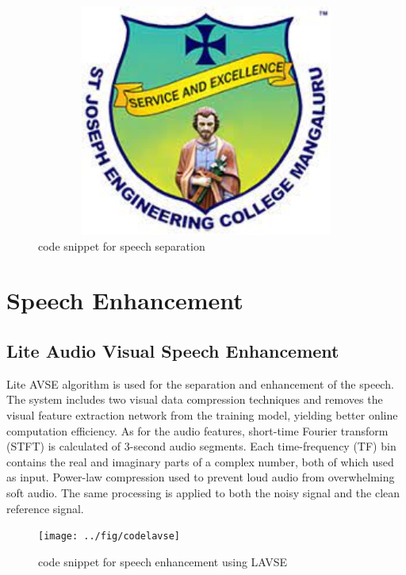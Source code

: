 \documentclass[12pt,a4paper]{report}
\begin{document}
\begin{figure}[hbtp]
\centering
\includegraphics[width=5in,height=3in]{./pic/sjeclogo.png}
\caption{code snippet for speech separation}
\end{figure}

\section{Speech Enhancement}
\subsection{Lite Audio Visual Speech Enhancement}
\par
Lite AVSE algorithm is used for the separation and enhancement of the speech. The system 
includes two visual data compression techniques and removes the visual feature extraction 
network from the training model, yielding better online computation efficiency. As for the audio 
features, short-time Fourier transform (STFT) is calculated of 3-second audio segments. Each 
time-frequency (TF) bin contains the real and imaginary parts of a complex number, both of 
which used as input. Power-law compression used to prevent loud audio from overwhelming soft 
audio. The same processing is applied to both the noisy signal and the clean reference signal.

\begin{figure}[hbtp]
\centering
\texttt{[image: ../fig/codelavse]}
\caption{code snippet for speech enhancement using LAVSE}
\end{figure}
\end{document}
